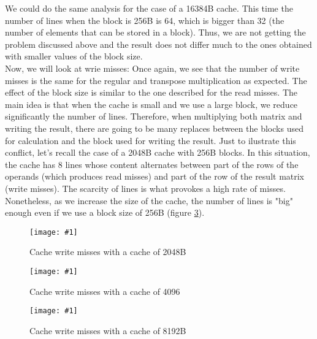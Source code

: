 \documentclass{article}
\newcommand{\myFigure}[4]{%
    \begin{figure}[!ht]
        \texttt{[image: \#1]}
        \centering
        \caption{#2}
        \label{#3}
    \end{figure}
}
\begin{document}
We could do the same analysis for the case of a 16384B cache. 
This time the number of lines when the block is 256B is 64, which is bigger than 32 (the number of elements that can be stored in a block).
Thus, we are not getting the problem discussed above and the result does not differ much to the ones obtained with smaller values of the block size.\\


Now, we will look at wrie misses:
Once again, we see that the number of write misses is the same for the regular and transpose multiplication as expected. The effect of the block size is similar to the one described for the read misses. The main idea is that when the cache is small and we use a large block, we reduce significantly the number of lines. Therefore, when multiplying both matrix and writing the result, there are going to be many replaces between the blocks used for calculation and the block used for writing the result. Just to ilustrate this conflict, let's recall the case of a 2048B cache with 256B blocks. In this situation, the cache has 8 lines whose content alternates between part of the rows of the operands (which produces read misses) and part of the row of the result matrix (write misses). The scarcity of lines is what provokes a high rate of misses. Nonetheless, as we increase the size of the cache, the number of lines is "big" enough even if we use a block size of 256B (figure \ref{block_8192B_esc}). 


\myFigure{../material_P3/protect_out4/BlockSize_2048/cache_escritura.png}{Cache write misses with a cache of 2048B}{block_2048_esc}{0.52}


\myFigure{../material_P3/protect_out4/BlockSize_4096/cache_escritura.png}{Cache write misses with a cache of 4096}{block_4096_esc}{0.52}

\myFigure{../material_P3/protect_out4/BlockSize_8192/cache_escritura.png}{Cache write misses with a cache of 8192B}{block_8192B_esc}{0.52}

\end{document}
